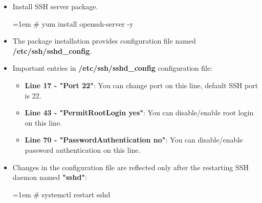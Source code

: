 \setlength{\columnsep}{3pt}
\begin{flushleft}

\bigskip
\begin{itemize}
	\item Install SSH server package.
	\bigskip
	\begin{tcolorbox}[breakable,notitle,boxrule=-0pt,colback=black,colframe=black]
		\color{green}
		\font=1em
		\# yum install openssh-server -y
		\font=4pt
	\end{tcolorbox}
	\bigskip
	\item The package installation provides configuration file named \textbf{/etc/ssh/sshd\_config}.
	\bigskip
	\item Important entries in \textbf{/etc/ssh/sshd\_config} configuration file:
	\begin{itemize}
		\item \textbf{Line 17 - "Port 22"}: You can change port on this line, default SSH port is 22.
		\item \textbf{Line 43 - "PermitRootLogin yes"}: You can disable/enable root login on this line.
		\item \textbf{Line 70 - "PasswordAuthentication no"}: You can disable/enable password authentication on this line.
	\end{itemize}
	\bigskip
	\item Changes in the configuration file are reflected only after the restarting SSH daemon named \textbf{"sshd"}:
	\bigskip
	\begin{tcolorbox}[breakable,notitle,boxrule=-0pt,colback=black,colframe=black]
		\color{green}
		\font=1em
		\# systemctl restart sshd
		\font=4pt
	\end{tcolorbox}
	
	
	\bigskip
	

	
	
\end{itemize}





\end{flushleft}
\newpage


